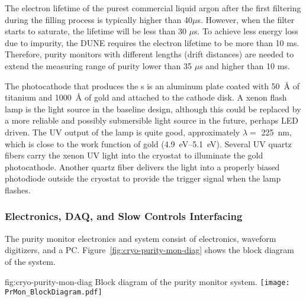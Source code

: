The electron lifetime of the purest commercial liquid argon after the first filtering during the filling process is typically higher than 40$\mu$s. However, when the filter starts to saturate, the lifetime will be less than 30 $\mu$s.  To achieve less energy loss due to impurity,  the DUNE  requires the electron lifetime to be more than 10 ms. Therefore, purity monitors with different lengths (drift distances) are needed to extend the measuring range of purity lower than 35 $\mu$s and higher than 10 ms.

The photocathode that produces the \phel{}s is an aluminum plate coated with \SI{50}{\angstrom} of titanium and \SI{1000}{\angstrom} of gold and attached to the cathode disk. A xenon flash lamp is the light source in the baseline design, although this could be replaced by a more reliable and possibly submersible light source in the future, perhaps LED driven. The UV output of the lamp is quite good, approximately $\lambda=$ \SI{225}{\nano\meter}, which is close to the work function of gold (\SIrange{4.9}{5.1}{\eV}). Several UV quartz fibers carry the xenon UV light into the cryostat to illuminate the gold photocathode.   Another quartz fiber delivers the light into a properly biased photodiode outside the cryostat to provide the trigger signal when the lamp flashes. 



\subsubsection{Electronics, DAQ, and Slow Controls Interfacing}
The purity monitor electronics and  system consist of  electronics, waveform digitizers, and a  PC.  Figure~\ref{fig:cryo-purity-mon-diag} shows the block diagram of the system.


\begin{dunefigure}{fig:cryo-purity-mon-diag}
  {Block diagram of the purity monitor system.}
  \texttt{[image: PrMon\_BlockDiagram.pdf]}
\end{dunefigure}


